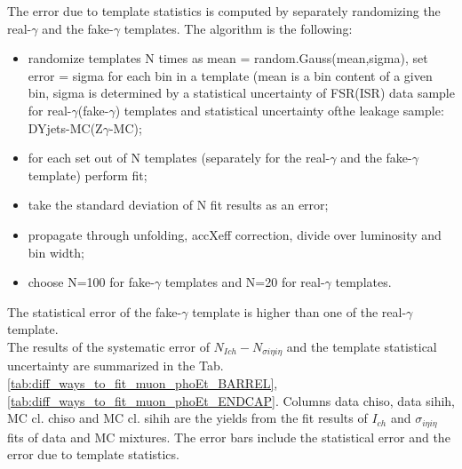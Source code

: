The error due to template statistics is computed by separately randomizing the real-$\gamma$ and the fake-$\gamma$ templates. The algorithm is the following:\\
\begin{itemize}
  \item randomize templates N times as mean = random.Gauss(mean,sigma), set error = sigma for each bin in a template (mean is a bin content of a given bin, sigma is determined by a statistical uncertainty of FSR(ISR) data sample for real-$\gamma$(fake-$\gamma$) templates and statistical uncertainty ofthe  leakage sample: DYjets-MC(Z$\gamma$-MC);
  \item for each set out of N templates (separately for the real-$\gamma$ and the fake-$\gamma$ template) perform fit;
  \item take the standard deviation of N fit results as an error;
  \item propagate through unfolding, accXeff correction, divide over luminosity and bin width;
  \item choose N=100 for fake-$\gamma$ templates and N=20 for real-$\gamma$ templates.
\end{itemize}
The statistical error of the fake-$\gamma$ template is higher than one of the real-$\gamma$ template.\\

The results of the systematic error of $N_{Ich}-N_{\sigma i\eta i\eta}$ and the template statistical uncertainty are summarized in the Tab. \ref{tab:diff_ways_to_fit_muon_phoEt_BARREL}, \ref{tab:diff_ways_to_fit_muon_phoEt_ENDCAP}. Columns data chiso, data sihih, MC cl. chiso and MC cl. sihih are the yields from the fit results of $I_{ch}$ and $\sigma_{i\eta i\eta}$ fits of data and MC mixtures. The error bars include the statistical error and the error due to template statistics. %

